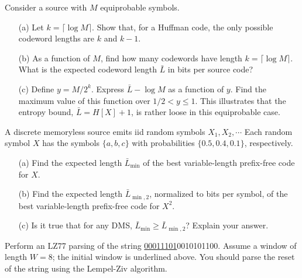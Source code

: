 \documentclass{assignment}
\begin{document}
\begin{prob}[2.14]
    Consider a source with $M$ equiprobable symbols.
    \begin{itemize}
        \item[(a)] Let $k=\lceil\log M\rceil$. Show that, for a Huffman code, the only possible codeword lengths are $k$ and $k-1$.
        \item[(b)] As a function of $M$, find how many codewords have length $k=\lceil\log M\rceil$. What is the expected codeword length $\bar{L}$ in bits per source code?
        \item[(c)] Define $y=M/2^k$. Express $\bar{L}-\log M$ as a function of $y$. Find the maximum value of this function over $1/2<y\leq 1$. This illustrates that the entropy bound, $\bar{L}=H[X]+1$, is rather loose in this equiprobable case.
    \end{itemize}
\end{prob}
\begin{sol}
\end{sol}

\begin{prob}[2.21]
    A discrete memoryless source emits iid random symbols $X_1,X_2,\cdots$ Each random symbol $X$ has the symbols $\{a,b,c\}$ with probabilities $\{0.5,0.4,0.1\}$, respectively.
    \begin{itemize}
        \item[(a)] Find the expected length $\bar{L}_{\min}$ of the best variable-length prefix-free code for $X$.
        \item[(b)] Find the expected length $\bar{L}_{\min,2}$, normalized to bits per symbol, of the best variable-length prefix-free code for $X^2$.
        \item[(c)] Is it true that for any DMS, $\bar{L}_{\min}\geq\bar{L}_{\min,2}$? Explain your answer.
    \end{itemize}
\end{prob}
\begin{sol}
\end{sol}

\begin{prob}[2.33]
    Perform an LZ77 parsing of the string \uline{00011101}0010101100. Assume a window of length $W=8$; the initial window is underlined above. You should parse the reset of the string using the Lempel-Ziv algorithm.
\end{prob}
\begin{sol}
\end{sol}
\end{document}
